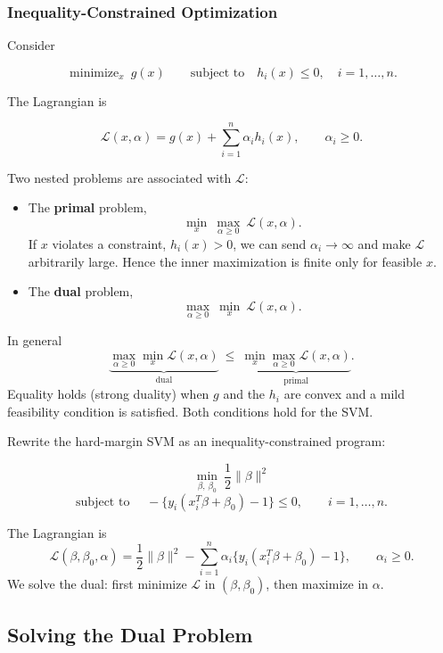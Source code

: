 \documentclass[
]{book}
\begin{document}
\subsubsection*{Inequality-Constrained Optimization}\label{inequality-constrained-optimization}

Consider

\[
\operatorname{minimize}_{x}\ g(x)
\qquad\text{subject to}\quad
h_i(x)\le 0,\quad i=1,\ldots,n.
\]

The Lagrangian is

\[
\mathcal{L}(x,\alpha) = g(x) + \sum_{i=1}^{n} \alpha_i h_i(x),\qquad \alpha_i\ge 0.
\]

Two nested problems are associated with \(\mathcal{L}\):

\begin{itemize}
\item
  The \textbf{primal} problem,
  \[
  \min_{x}\ \max_{\alpha\ge 0}\ \mathcal{L}(x,\alpha).
  \]
  If \(x\) violates a constraint, \(h_i(x)>0\), we can send \(\alpha_i\to\infty\) and make \(\mathcal{L}\) arbitrarily large. Hence the inner maximization is finite only for feasible \(x\).
\item
  The \textbf{dual} problem,
  \[
  \max_{\alpha\ge 0}\ \min_{x}\ \mathcal{L}(x,\alpha).
  \]
\end{itemize}

In general
\[
\underbrace{\max_{\alpha\ge 0}\min_{x}\mathcal{L}(x,\alpha)}_{\text{dual}}
\ \le\
\underbrace{\min_{x}\max_{\alpha\ge 0}\mathcal{L}(x,\alpha)}_{\text{primal}}.
\]
Equality holds (strong duality) when \(g\) and the \(h_i\) are convex and a mild feasibility condition is satisfied. Both conditions hold for the SVM.

Rewrite the hard-margin SVM as an inequality-constrained program:

\[
\min_{\beta,\,\beta_0}\ \frac12\|\beta\|^2
\]
\[
\text{subject to }\quad
-\bigl\{y_i(x_i^T\beta+\beta_0)-1\bigr\}\le 0,\qquad i=1,\ldots,n.
\]

The Lagrangian is
\[
\mathcal{L}(\beta,\beta_0,\alpha)
= \frac12\|\beta\|^2
- \sum_{i=1}^{n}\alpha_i\bigl\{y_i(x_i^T\beta+\beta_0)-1\bigr\},
\qquad \alpha_i\ge 0.
\]
We solve the dual: first minimize \(\mathcal{L}\) in \((\beta,\beta_0)\), then maximize in \(\alpha\).

\subsection{Solving the Dual Problem}\label{solving-the-dual-problem}
\end{document}
